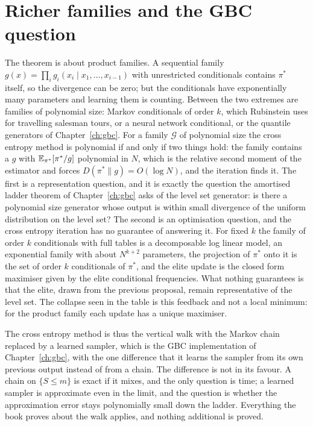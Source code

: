 \section{Richer families and the GBC question}

The theorem is about product families. A sequential family $g(x) = \prod_i g_i(x_i \mid x_1, \dots, x_{i-1})$ with unrestricted conditionals contains $\pi^*$ itself, so the divergence can be zero; but the conditionals have exponentially many parameters and learning them is counting. Between the two extremes are families of polynomial size: Markov conditionals of order $k$, which Rubinstein uses for travelling salesman tours, or a neural network conditional, or the quantile generators of Chapter~\ref{ch:gbc}. For a family $\mathcal{G}$ of polynomial size the cross entropy method is polynomial if and only if two things hold: the family contains a $g$ with $\mathbb{E}_{\pi^*}[\pi^*/g]$ polynomial in $N$, which is the relative second moment of the estimator and forces $D(\pi^* \| g) = O(\log N)$, and the iteration finds it. The first is a representation question, and it is exactly the question the amortised ladder theorem of Chapter~\ref{ch:gbc} asks of the level set generator: is there a polynomial size generator whose output is within small divergence of the uniform distribution on the level set? The second is an optimisation question, and the cross entropy iteration has no guarantee of answering it. For fixed $k$ the family of order $k$ conditionals with full tables is a decomposable log linear model, an exponential family with about $N^{k+2}$ parameters, the projection of $\pi^*$ onto it is the set of order $k$ conditionals of $\pi^*$, and the elite update is the closed form maximiser given by the elite conditional frequencies. What nothing guarantees is that the elite, drawn from the previous proposal, remain representative of the level set. The collapse seen in the table is this feedback and not a local minimum: for the product family each update has a unique maximiser.

The cross entropy method is thus the vertical walk with the Markov chain replaced by a learned sampler, which is the GBC implementation of Chapter~\ref{ch:gbc}, with the one difference that it learns the sampler from its own previous output instead of from a chain. The difference is not in its favour. A chain on $\{ S \le m \}$ is exact if it mixes, and the only question is time; a learned sampler is approximate even in the limit, and the question is whether the approximation error stays polynomially small down the ladder. Everything the book proves about the walk applies, and nothing additional is proved.

